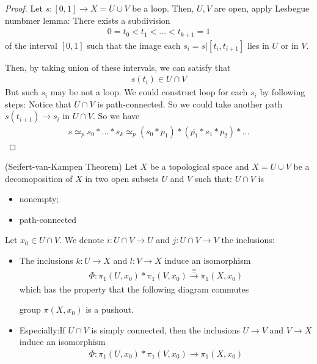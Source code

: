 \documentclass[Total.tex]{subfiles}
\begin{document}
		\begin{proof}
			Let $s:[0,1]\rightarrow X=U\cup V$ be a loop. Then, $U,V$ are open, apply Lesbegue numbmer lemma: There exists a subdivision
			\begin{gather*}
				0=t_0<t_1<\dots<t_{k+1}=1	
			\end{gather*}
			of the interval $[0,1]$ such that the image each $s_i=s|[t_i,t_{i+1}]$ lies in $U$ or in $V$. 
			
			Then, by taking union of these intervals, we can satisfy that
			\begin{gather*}
				s(t_i)\in U\cap V
			\end{gather*}
			But such $s_i$ may be not a loop. We could construct loop for each $s_i$ by following steps: Notice that $U\cap V$ is path-connected. So we could take another path $s(t_{i+1})\rightarrow s_i$ in $U\cap V$. So we have
			\begin{gather*}
				s\simeq_p s_0*\dots*s_k\simeq_p (s_0*p_1)*(\bar{p_1}*s_1*p_2)*\dots 
			\end{gather*}
		\end{proof}
		\begin{theorem}
			(Seifert-van-Kampen Theorem) Let $X$ be a topological space and $X=U\cup V$ be a decomoposition of $X$ in two open subsets $U$ and $V$ such that: $U\cap V$ is 
			\begin{itemize}
				\item nonempty;
				\item path-connected
			\end{itemize}
			Let $x_0\in U\cap V$. We denote $i:U\cap V\rightarrow U$ and $j:U\cap V\rightarrow V$ the inclusions:
			\begin{itemize}
				\item The inclusions $k:U\rightarrow X$ and $l:V\rightarrow X$ induce an isomorphism
				\begin{gather*}
					\Phi:\pi_1(U,x_0)*\pi_1(V,x_0)\stackrel{\cong}{\rightarrow} \pi_1(X,x_0)
				\end{gather*}
				which has the property that the following diagram commutes
				\begin{center}
				\end{center}
				group $\pi(X,x_0)$ is a pushout.
				\item Especially:If $U\cap V$ is simply connected, then the inclusions $U\rightarrow V$ and $V\rightarrow X$ induce an isomorphism
				\begin{gather*}
					\Phi:\pi_1(U,x_0)*\pi_1(V,x_0)\rightarrow \pi_1(X,x_0)
				\end{gather*}
			\end{itemize}
		\end{theorem}
\end{document}
